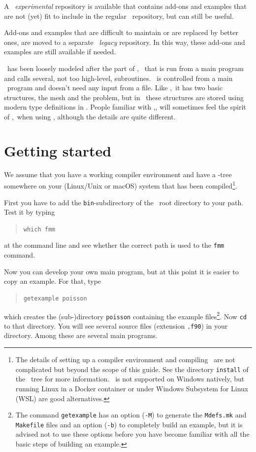 A \tfem\ \emph{experimental} repository is available that
contains add-ons and examples that are not (yet) fit to include in the regular
\tfem\ repository, but can still be useful.

Add-ons and examples that are difficult to maintain or are replaced by better
ones, are moved to a separate \tfem\ \emph{legacy} repository. In this way, these add-ons and
examples are still available if needed.

\tfem\ has been loosely modeled after the part of \sep\ \cite{Segal93} 
that is run from a main program and calls several, not too high-level,
subroutines.
\tfem\ is controlled from a main \ftn\ program and doesn't need any
input from a file. Like \sep\ it has two basic structures, the mesh and the
problem, but in \tfem\ these structures are stored using modern type
definitions in \ftn. People familiar with \sep, will sometimes feel the spirit
of \sep\ when using \tfem, although the details are quite different.

\section{Getting started}
\label{sec:gettingstarted}

We assume that you have a working compiler 
environment and have a \tfem-tree somewhere on your (Linux/Unix or macOS) system
that has been compiled\footnote{The details of setting up a
compiler environment and compiling \tfem\ are not complicated but beyond the scope of this guide.
See the directory \texttt{install} of the \tfem\ tree for more information.
\tfem\ is not supported on Windows natively, but running Linux in a Docker container or under Windows Subsystem for Linux (WSL) are good alternatives.}.

First you have to add the \texttt{bin}-subdirectory of the \tfem\ root directory
to your path. Test it by typing 
\begin{quote}
  \texttt{which fmm}
\end{quote}
at the command line and see whether the correct path is used to the
\texttt{fmm} command.

Now you can develop your own main program, but at this point it is easier to
copy an example. For that, type
\begin{quote}
   \texttt{getexample poisson}
\end{quote}
which creates the (sub-)directory \texttt{poisson} containing the example files\footnote{The command \texttt{getexample} has an option 
(\texttt{-M})
to generate the \texttt{Mdefs.mk} and \texttt{Makefile} files and an option 
(\texttt{-b}) to 
completely build an example, but it is
advised not to use these options before you have become familiar with all the basic
steps of building an example.}. Now 
\texttt{cd} to that directory.
You will see several source files (extension \texttt{.f90}) in your directory.
Among these are several main programs.

